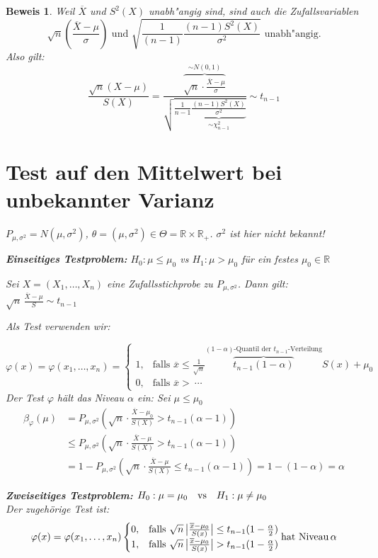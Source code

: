 \documentclass[a4paper,11pt]{book}
\newcommand{\R}{{\mathbb R}}
\theoremstyle{nonumberplain}
\newtheorem{Bew}{Beweis}
\begin{document}
\begin{Bew}
Weil $\overline{X}$ und $S^2(X)$ unabh"angig sind, sind auch die Zufallsvariablen \[\sqrt{n}\left(\frac{\overline{X}-\mu}{\sigma}\right) \text{ und } \sqrt{\frac{1}{(n-1)}\frac{(n-1) S^2(X)}{\sigma^2}} \text{ unabh"angig.}\]
Also gilt:
\[\frac{\sqrt{n}(X-\mu )}{S(X)}=\frac{\overbrace{\sqrt{n}\cdot \frac{\overline{X}-\mu}{\sigma}}^{\sim N(0,1)}}{\sqrt{\frac{1}{n-1}\underbrace{\frac{(n-1) S^2(X)}{\sigma^2}}_{\sim \chi_{n-1}^2}}}\sim t_{n-1} \]

\section[Mittelwert bei unbekannter Varianz]{Test auf den Mittelwert bei unbekannter Varianz}
$P_{\mu,\sigma^2} = N(\mu,\sigma^2)$, $\theta=(\mu,\sigma^2)\in \Theta = \R\times\R_+$. $\sigma^2$ ist hier nicht bekannt!

\textbf{Einseitiges Testproblem:} $H_0: \mu\leq \mu_0$ vs $H_1: \mu > \mu_0$ für ein festes $\mu_0\in\R$

Sei $X=(X_1,\ldots,X_n)$ eine Zufallsstichprobe zu $P_{\mu,\sigma^2}$. Dann gilt: $\sqrt{n}\,\frac{\overline{X}-\mu}{S}\sim t_{n-1}$

Als Test verwenden wir:

\[\varphi(x)=\varphi(x_1,\ldots,x_n)=\begin{cases}
1, & \text{falls } \overline x \le \frac1{\sqrt{n}}\overbrace{t_{n-1}(1-\alpha)}^{(1-\alpha) \text{-Quantil der }t_{n-1}\text{-Verteilung}}S(x)+\mu_0 \\
0, & \text{falls } \overline x  > \ \cdots
\end{cases}\]
Der Test $\varphi$ hält das Niveau $\alpha$ ein: Sei $\mu\leq \mu_0$
\begin{align*}
\beta_{\varphi}(\mu) &= P_{\mu,\sigma^2}\left(\sqrt{n}\cdot\frac{\overline{X}-\mu_0}{S(X)}> t_{n-1}(\alpha -1)\right) \\
& \leq P_{\mu,\sigma^2}\left(\sqrt{n}\cdot\frac{\overline{X}-\mu}{S(X)}> t_{n-1}(\alpha -1)\right) \\
&=1-P_{\mu,\sigma^2}\left(\sqrt{n}\cdot\frac{\overline{X}-\mu}{S(X)}\leq t_{n-1}(\alpha -1)\right)= 1-(1-\alpha)=\alpha 
\end{align*}

\textbf{Zweiseitiges Testproblem:} $H_0: \mu = \mu_0 \quad \textnormal{vs}\quad H_1: \mu \neq \mu_0$\\
Der zugehörige Test ist:
\[\varphi(x)=\varphi(x_1,\ldots,x_n)
\begin{cases}
0, &\text{falls }  \sqrt{n}\,\bigl|\frac{\overline{x}-\mu_0}{S(x)}\bigr| \le t_{n-1}(1-\frac{\alpha}{2}) \\
1, &\text{falls } \sqrt{n}\,\bigl|\frac{\overline{x}-\mu_0}{S(x)}\bigr| > t_{n-1}(1-\frac{\alpha}{2}) 
\end{cases}
\textnormal{hat Niveau}\,\alpha \]
\end{Bew}
\end{document}
